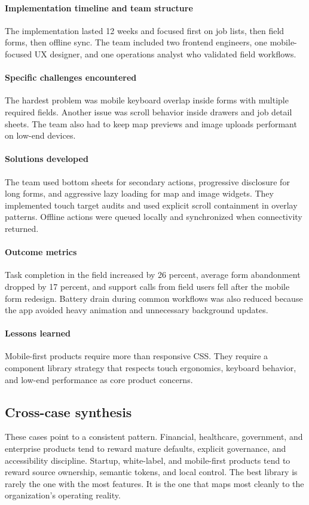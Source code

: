 \paragraph{Implementation timeline and team structure}
The implementation lasted 12 weeks and focused first on job lists, then field forms, then offline sync. The team included two frontend engineers, one mobile-focused UX designer, and one operations analyst who validated field workflows.

\paragraph{Specific challenges encountered}
The hardest problem was mobile keyboard overlap inside forms with multiple required fields. Another issue was scroll behavior inside drawers and job detail sheets. The team also had to keep map previews and image uploads performant on low-end devices.

\paragraph{Solutions developed}
The team used bottom sheets for secondary actions, progressive disclosure for long forms, and aggressive lazy loading for map and image widgets. They implemented touch target audits and used explicit scroll containment in overlay patterns. Offline actions were queued locally and synchronized when connectivity returned.

\paragraph{Outcome metrics}
Task completion in the field increased by 26 percent, average form abandonment dropped by 17 percent, and support calls from field users fell after the mobile form redesign. Battery drain during common workflows was also reduced because the app avoided heavy animation and unnecessary background updates.

\paragraph{Lessons learned}
Mobile-first products require more than responsive CSS. They require a component library strategy that respects touch ergonomics, keyboard behavior, and low-end performance as core product concerns.

\subsection{Cross-case synthesis}
These cases point to a consistent pattern. Financial, healthcare, government, and enterprise products tend to reward mature defaults, explicit governance, and accessibility discipline. Startup, white-label, and mobile-first products tend to reward source ownership, semantic tokens, and local control. The best library is rarely the one with the most features. It is the one that maps most cleanly to the organization's operating reality.

